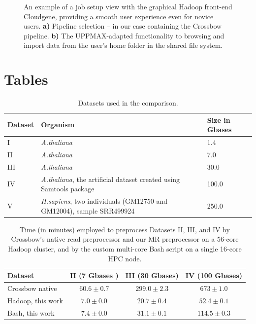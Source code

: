 \documentclass[10pt]{article}
\begin{document}
\begin{figure}[!ht]
\begin{subfigure}[b]{0.6\textwidth}
		\subcaption{}
	\end{subfigure}
	\caption{%
	An example of a job setup view with the graphical Hadoop front-end Cloudgene,
	providing a smooth user experience even for novice users. \textbf{a)} Pipeline
	selection -- in our case containing the Crossbow pipeline. \textbf{b)} The
	UPPMAX-adapted functionality to browsing and import data from the user's home
	folder in the shared file system.
	}
	\label{fig:fig4}
\end{figure}



\section*{Tables}

\begin{table}[!ht]
\small
\footnotesize
\caption{Datasets used in the comparison. }
\begin{center}
\begin{tabular}{|l|l|l|}
Dataset &	Organism &	Size in Gbases\\
\hline
 I		&	{\it A.thaliana}	&	1.4	\\
 II	&	{\it A.thaliana}	&	7.0\\
 III	&	{\it A.thaliana}	&	30.0	\\
 IV	&{\it A.thaliana}, the artificial dataset created using Samtools package	&	100.0	\\
 V	&	{\it H.sapiens}, two individuals (GM12750 and GM12004), sample SRR499924		&	250.0\\

\end{tabular}
\end{center}
\label{table:datasets}
\normalsize
\end{table}%


\begin{table}[!ht]
\small
\caption{%
	Time (in minutes) employed to preprocess Datasets II, III, and IV by
	Crossbow's native read preprocessor and our MR preprocessor on a 56-core Hadoop
	cluster, and by the custom multi-core Bash script on a single 16-core HPC node.
	}

\begin{center}
\begin{tabular}{l|c|c|c}
Dataset			&		II (7 Gbases )	& III (30 Gbases)	& IV (100 Gbases)\\
\hline
Crossbow native			&		$60.6\pm0.7$	& $299.0\pm2.3$	&	$673\pm1.0$	\\
Hadoop, this work			&		$7.0\pm0.0$	&	$20.7\pm0.4$&		$52.4\pm0.1$\\
Bash, this work			& 		$7.4\pm0.0$	&	$31.1\pm0.1$	&	$114.5\pm0.3$	\\
\end{tabular}
\end{center}
\label{table:preprocess}
\normalsize
\end{table}%
\end{document}
